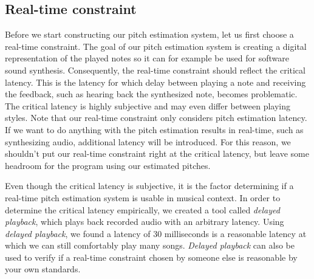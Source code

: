 \documentclass[a4paper,10pt,twocolumn]{article}
\begin{document}
\subsection{Real-time constraint}  \label{sec:constraint}
Before we start constructing our pitch estimation system, let us first choose a real-time constraint. The goal of our pitch estimation system is creating a digital representation of the played notes so it can for example be used for software sound synthesis. Consequently, the real-time constraint should reflect the critical latency. This is the latency for which delay between playing a note and receiving the feedback, such as hearing back the synthesized note, becomes problematic. The critical latency is highly subjective and may even differ between playing styles.
Note that our real-time constraint only considers pitch estimation latency. If we want to do anything with the pitch estimation results in real-time, such as synthesizing audio, additional latency will be introduced. For this reason, we shouldn't put our real-time constraint right at the critical latency, but leave some headroom for the program using our estimated pitches.

Even though the critical latency is subjective, it is the factor determining if a real-time pitch estimation system is usable in musical context. In order to determine the critical latency empirically, we created a tool called \textit{delayed playback}, which plays back recorded audio with an arbitrary latency. Using \textit{delayed playback}, we found a latency of 30 milliseconds is a reasonable latency at which we can still comfortably play many songs. \textit{Delayed playback} can also be used to verify if a real-time constraint chosen by someone else is reasonable by your own standards.%

\end{document}
